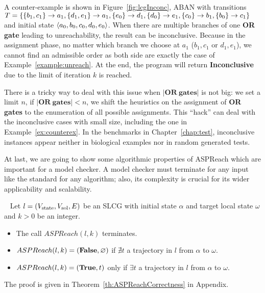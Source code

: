 \begin{example}\label{ex:counterex}
A counter-example is shown in Figure~\ref{fig:lcgInconc}, ABAN with transitions $T=\{\acm{b_1,c_1}{a_0}{a_1},\acm{d_1,e_1}{a_0}{a_1},\acm{e_0}{d_0}{d_1},\acm{d_0}{e_0}{e_1},\acm{c_0}{b_0}{b_1},\acm{b_0}{c_0}{c_1}\}$ and initial state $\init{a_0,b_0,c_0,d_0,e_0}$.
When there are multiple branches of one \textbf{OR gate} leading to unreachability, the result can be inconclusive. 
Because in the assignment phase, no matter which branch we choose at $a_1$ ($b_1,c_1$ or $d_1,e_1$), we cannot find an admissible order as both side are exactly the case of Example~\ref{example:unreach}.
At the end, the program will return \textbf{Inconclusive} due to the limit of iteration $k$ is reached.
\end{example}

There is a tricky way to deal with this issue when $\mathbf{|OR\ gates|}$ is not big: we set a limit $n$, if $\mathbf{|OR\ gates|}<n$, we shift the heuristics on the assignment of \textbf{OR gates} to the enumeration of all possible assignments.
This ``hack'' can deal with the inconclusive cases with small size, including the one in Example~\ref{ex:counterex}.
In the benchmarks in Chapter~\ref{chap:test}, inconclusive instances appear neither in biological examples nor in random generated tests.

At last, we are going to show some algorithmic properties of ASPReach which are important for a model checker.
A model checker must terminate for any input like the standard for any algorithm; also, its complexity is crucial for its wider applicability and scalability.

\begin{theorem}~
    Let $l=(V_\st, V_\sol, E)$ be an SLCG with initial state $\alpha$ and target local state $\omega$ and $k > 0$ be an integer.
    \begin{itemize}
        \item The call $ASPReach(l,k)$ terminates.
        \item $ASPReach(l,k)=(\false,\varnothing)$ if $\nexists t$ a trajectory in $l$ from $\alpha$ to $\omega$.
        \item $ASPReach(l,k)=(\true,t)$ only if $\exists t$ a trajectory in $l$ from $\alpha$ to $\omega$.
    \end{itemize}
    
    The proof is given in Theorem~\ref{th:ASPReachCorrectness} in Appendix.
\end{theorem}

